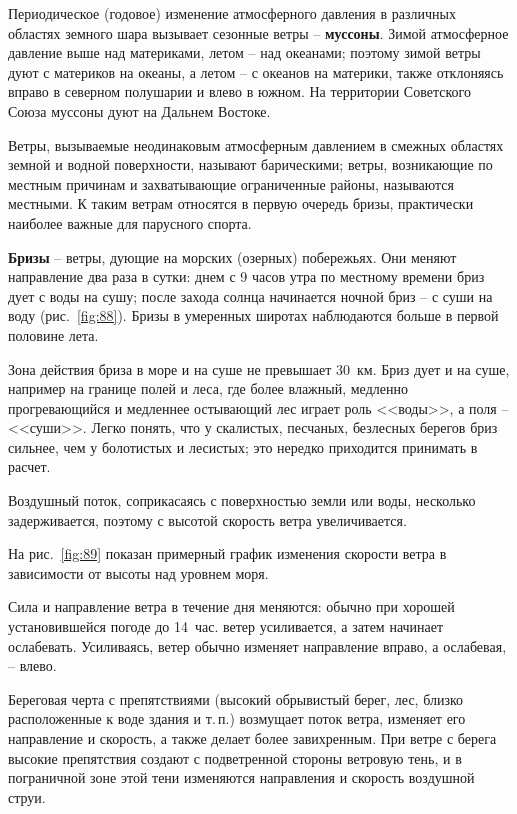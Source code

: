 \documentclass[a4paper, 12pt, twoside, final]{scrbook}
\begin{document}
Периодическое (годовое) изменение атмосферного давления в различных областях земного шара вызывает сезонные ветры \--- \textbf{муссоны}. Зимой атмосферное давление выше над материками, летом \--- над океанами; поэтому зимой ветры дуют с материков на океаны, а летом \--- с океанов на материки, также отклоняясь вправо в северном полушарии и влево в южном. На территории Советского Союза муссоны дуют на Дальнем Востоке.

Ветры, вызываемые неодинаковым атмосферным давлением в смежных областях земной и водной поверхности, называют барическими; ветры, возникающие по местным причинам и захватывающие ограниченные районы, называются местными. К таким ветрам относятся в первую очередь бризы, практически наиболее важные для парусного спорта.

\textbf{Бризы} \--- ветры, дующие на морских (озерных) побережьях. Они меняют направление два раза в сутки: днем с 9 часов утра по местному времени бриз дует с воды на сушу; после захода солнца начинается ночной бриз \--- с суши на воду (рис.~\ref{fig:88}). Бризы в умеренных широтах наблюдаются больше в первой половине лета.

Зона действия бриза в море и на суше не превышает 30~км. Бриз дует и на суше, например на границе полей и леса, где более влажный, медленно прогревающийся и медленнее остывающий лес играет роль <<воды>>, а поля \--- <<суши>>. Легко понять, что у скалистых, песчаных, безлесных берегов бриз сильнее, чем у болотистых и лесистых; это нередко приходится принимать в расчет.

Воздушный поток, соприкасаясь с поверхностью земли или воды, несколько задерживается, поэтому с высотой скорость ветра увеличивается. 

На рис.~\ref{fig:89} показан примерный график изменения скорости ветра в зависимости от высоты над уровнем моря.

Сила и направление ветра в течение дня меняются: обычно при хорошей установившейся погоде до 14~час. ветер усиливается, а затем начинает ослабевать. Усиливаясь, ветер обычно изменяет направление вправо, а ослабевая, \--- влево.

Береговая черта с препятствиями (высокий обрывистый берег, лес, близко расположенные к воде здания и т.\,п.) возмущает поток ветра, изменяет его направление и скорость, а также делает более завихренным. При ветре с берега высокие препятствия создают с подветренной стороны ветровую тень, и в пограничной зоне этой тени изменяются направления и скорость воздушной струи.
\end{document}
